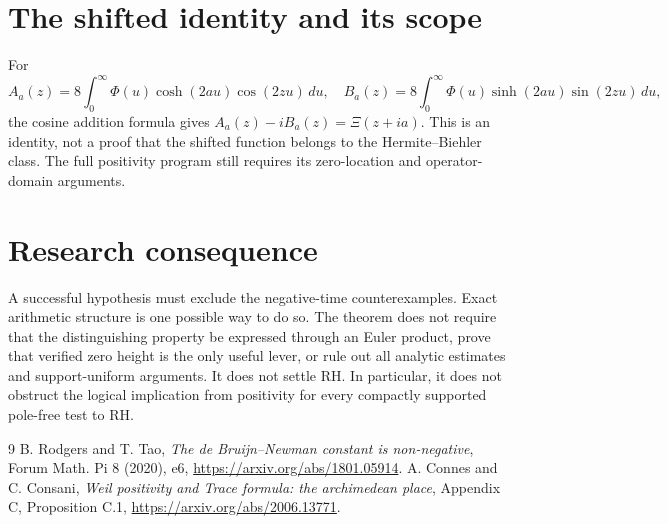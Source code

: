 \documentclass[11pt]{article}
\begin{document}
\section{The shifted identity and its scope}
For
\[
 A_a(z)=8\int_0^\infty\Phi(u)\cosh(2au)\cos(2zu)\,du,\quad
 B_a(z)=8\int_0^\infty\Phi(u)\sinh(2au)\sin(2zu)\,du,
\]
the cosine addition formula gives $A_a(z)-iB_a(z)=\Xi(z+ia)$.
This is an identity, not a proof that the shifted function belongs to the
Hermite--Biehler class. The full positivity program still requires its
zero-location and operator-domain arguments.

\section{Research consequence}
A successful hypothesis must exclude the negative-time counterexamples.
Exact arithmetic structure is one possible way to do so. The theorem does not
require that the distinguishing property be expressed through an Euler product,
prove that verified zero height is the only useful lever, or rule out all
analytic estimates and support-uniform arguments. It does not settle RH.
In particular, it does not obstruct the logical implication from positivity
for every compactly supported pole-free test to RH.

\begin{thebibliography}{9}
 B. Rodgers and T. Tao,
\emph{The de Bruijn--Newman constant is non-negative},
Forum Math. Pi 8 (2020), e6,
\url{https://arxiv.org/abs/1801.05914}.
 A. Connes and C. Consani,
\emph{Weil positivity and Trace formula: the archimedean place},
Appendix C, Proposition C.1,
\url{https://arxiv.org/abs/2006.13771}.
\end{thebibliography}
\end{document}
